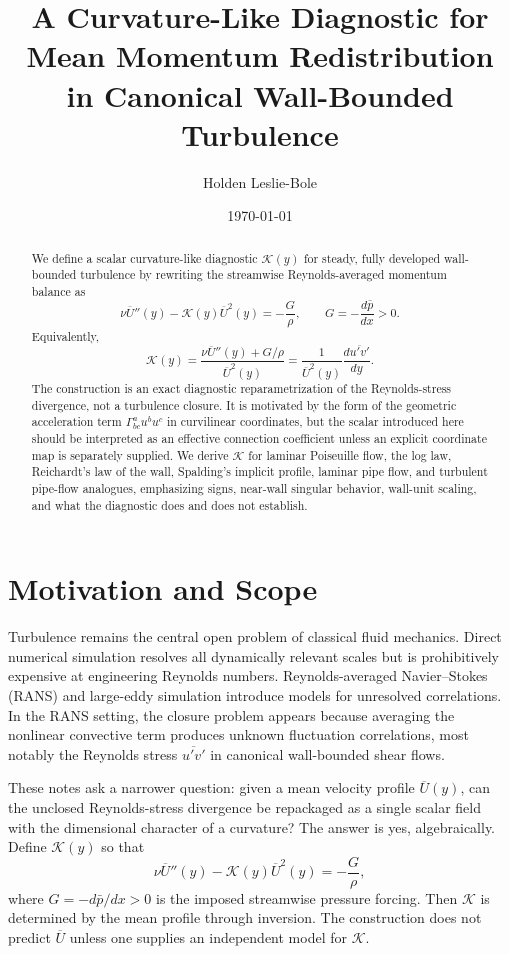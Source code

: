 \documentclass[11pt]{article}
\title{A Curvature-Like Diagnostic for Mean Momentum Redistribution\\in Canonical Wall-Bounded Turbulence}
\author{Holden Leslie-Bole}
\date{\today}
\newcommand{\Ut}{\overline{U}}
\newcommand{\uv}{\overline{u'v'}}
\newcommand{\kapg}{\mathcal{K}}
\begin{document}
\maketitle

\begin{abstract}
We define a scalar curvature-like diagnostic $\kapg(y)$ for steady, fully developed wall-bounded turbulence by rewriting the streamwise Reynolds-averaged momentum balance as
\begin{equation*}
\nu \Ut''(y) - \kapg(y)\Ut^2(y) = -\frac{G}{\rho}, \qquad G=-\frac{d\bar p}{dx}>0.
\end{equation*}
Equivalently,
\begin{equation*}
\kapg(y)=\frac{\nu \Ut''(y)+G/\rho}{\Ut^2(y)}=\frac{1}{\Ut^2(y)}\frac{d\uv}{dy}.
\end{equation*}
The construction is an exact diagnostic reparametrization of the Reynolds-stress divergence, not a turbulence closure. It is motivated by the form of the geometric acceleration term $\Gamma^a_{bc}u^bu^c$ in curvilinear coordinates, but the scalar introduced here should be interpreted as an effective connection coefficient unless an explicit coordinate map is separately supplied. We derive $\kapg$ for laminar Poiseuille flow, the log law, Reichardt's law of the wall, Spalding's implicit profile, laminar pipe flow, and turbulent pipe-flow analogues, emphasizing signs, near-wall singular behavior, wall-unit scaling, and what the diagnostic does and does not establish.
\end{abstract}

\tableofcontents
\newpage

\section{Motivation and Scope}

Turbulence remains the central open problem of classical fluid mechanics. Direct numerical simulation resolves all dynamically relevant scales but is prohibitively expensive at engineering Reynolds numbers. Reynolds-averaged Navier--Stokes (RANS) and large-eddy simulation introduce models for unresolved correlations. In the RANS setting, the closure problem appears because averaging the nonlinear convective term produces unknown fluctuation correlations, most notably the Reynolds stress $\uv$ in canonical wall-bounded shear flows.

These notes ask a narrower question: given a mean velocity profile $\Ut(y)$, can the unclosed Reynolds-stress divergence be repackaged as a single scalar field with the dimensional character of a curvature? The answer is yes, algebraically. Define $\kapg(y)$ so that
\begin{equation}
\nu \Ut''(y) - \kapg(y)\Ut^2(y) = -\frac{G}{\rho},
\label{eq:central}
\end{equation}
where $G=-d\bar p/dx>0$ is the imposed streamwise pressure forcing. Then $\kapg$ is determined by the mean profile through inversion. The construction does not predict $\Ut$ unless one supplies an independent model for $\kapg$.
\end{document}
